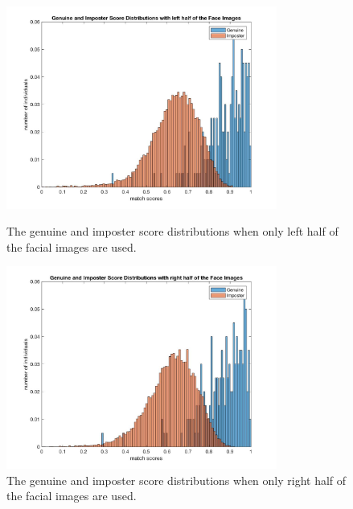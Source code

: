\documentclass[a4paper]{article}
\begin{document}
\begin{spacing}{2.0}
	\begin{figure}[!htb]
	\begin{minipage}[t]{0.5\linewidth}
	\centering
	\includegraphics[width = 3.5in]{left_scoreDis.jpg}
	\caption{The genuine and imposter score distributions when only left half of the facial images are used.}
	\label{scoreDisLeft}
	\end{minipage}
	\begin{minipage}[t]{0.5\linewidth}
	\centering
	\includegraphics[width = 3.5in]{right_scoreDis.jpg}
	\caption{The genuine and imposter score distributions when only right half of the facial images are used.}
	\label{scoreDisRight}
	\end{minipage}
	\end{figure}	
	

\end{spacing}
\end{document}
